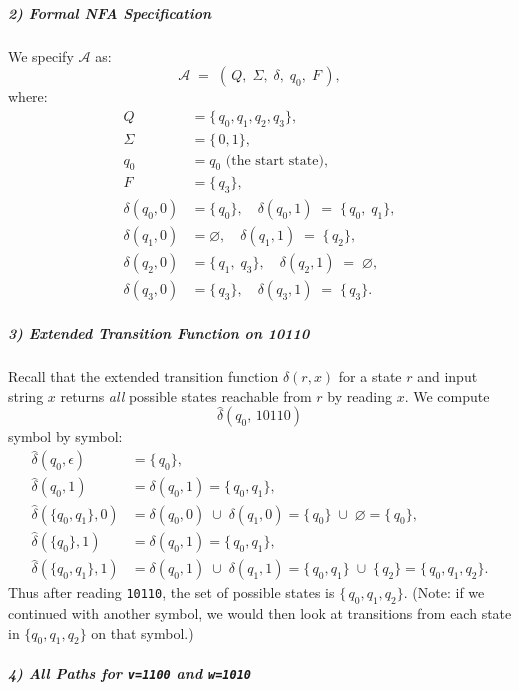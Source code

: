 \documentclass{article}
\begin{document}
\subparagraph*{2) Formal NFA Specification }
We specify $\mathcal{A}$ as:
\[
\mathcal{A} \;=\; (\,Q,\;\Sigma,\;\delta,\;q_0,\;F\,),
\]
where:
\[
\begin{aligned}
Q &= \{\,q_0,q_1,q_2,q_3\},\\
\Sigma &= \{\,0,1\},\\
q_0 &= q_0 \text{ (the start state)},\\
F &= \{\,q_3\},\\
\delta(q_0,0) &= \{\,q_0\},\quad \delta(q_0,1) \;=\; \{\,q_0,\;q_1\},\\
\delta(q_1,0) &= \varnothing,\quad \delta(q_1,1) \;=\; \{\,q_2\},\\
\delta(q_2,0) &= \{\,q_1,\;q_3\},\quad \delta(q_2,1) \;=\; \varnothing,\\
\delta(q_3,0) &= \{\,q_3\},\quad \delta(q_3,1) \;=\; \{\,q_3\}.
\end{aligned}
\]

\subparagraph*{3) Extended Transition Function on 10110}
Recall that the extended transition function $\hat{\delta}(r,x)$ for a state $r$ and input string $x$ returns \emph{all} possible states reachable from $r$ by reading $x$.  We compute 
\[
\hat{\delta}(q_0,\,10110)
\]
symbol by symbol:
\[
\begin{aligned}
\hat{\delta}(q_0,\epsilon) &= \{\,q_0\},\\
\hat{\delta}(q_0,1) &= \delta(q_0,1) = \{\,q_0,q_1\},\\
\hat{\delta}(\{q_0,q_1\},0) 
  &= \delta(q_0,0)\;\cup\;\delta(q_1,0) 
  = \{\,q_0\}\;\cup\;\varnothing 
  = \{\,q_0\},\\
\hat{\delta}(\{q_0\},1)
  &= \delta(q_0,1) 
  = \{\,q_0,q_1\},\\
\hat{\delta}(\{q_0,q_1\},1)
  &= \delta(q_0,1) \;\cup\;\delta(q_1,1) 
  = \{\,q_0,q_1\}\;\cup\;\{\,q_2\} 
  = \{\,q_0,q_1,q_2\}.
\end{aligned}
\]
Thus after reading \texttt{10110}, the set of possible states is $\{\,q_0,q_1,q_2\}$.  
(Note: if we continued with another symbol, we would then look at transitions from each state in $\{q_0,q_1,q_2\}$ on that symbol.)

\subparagraph*{4) All Paths for \texttt{v=1100} and \texttt{w=1010}}
\end{document}
